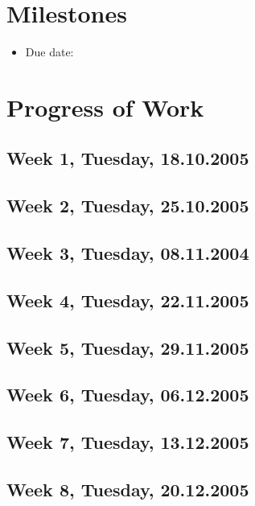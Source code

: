 \documentclass[12pt,fleqn,a4paper]{article}
\begin{document}
\newpage

\section{Milestones} %
\begin{itemize}
\item{Due date:}
\end{itemize}

\newpage

\section{Progress of Work} %

\subsection{Week 1, Tuesday, 18.10.2005}

\subsection{Week 2, Tuesday, 25.10.2005}

\subsection{Week 3, Tuesday, 08.11.2004}

\subsection{Week 4, Tuesday, 22.11.2005}

\subsection{Week 5, Tuesday, 29.11.2005}

\subsection{Week 6, Tuesday, 06.12.2005}

\subsection{Week 7, Tuesday, 13.12.2005}

\subsection{Week 8, Tuesday, 20.12.2005}
\end{document}

